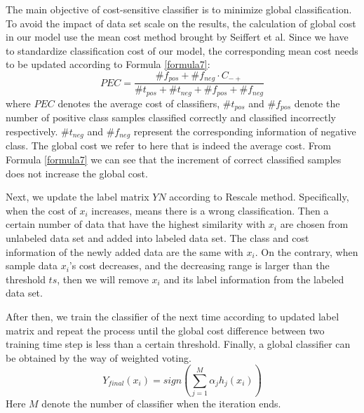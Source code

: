 \documentclass{svjour3}                     %
\begin{document}
The main objective of cost-sensitive classifier is to minimize global classification. To avoid the
impact of data set scale on the results, the calculation of global cost in our model use the mean cost method brought by Seiffert et al\cite{seiffert2008comparative}. Since we have to standardize classification cost of our model, the corresponding mean cost needs to be updated according to Formula \ref{formula7}:
\begin{equation} \label{formula7}
  PEC=\frac{{\# {f_{pos}} + \# {f_{neg}} \cdot {C_{ -  + }}}}{{\# {t_{pos}} + \# {t_{neg}} + \# {f_{pos}} + \# {f_{neg}}}}
\end{equation}
where $PEC$ denotes the average cost of classifiers, ${\# {t_{pos}}}$ and ${\# {f_{pos}}}$  denote the number of positive class samples classified correctly and classified incorrectly respectively. ${\# {t_{neg}}}$ and ${\# {f_{neg}}}$ represent the corresponding information of negative class. The global cost we refer to here that is indeed the average cost. From Formula \ref{formula7} we can see that the increment of correct classified samples does not increase the global cost. 

Next, we update the label matrix $YN$ according to Rescale method. Specifically, when the cost of $x_i$ increases, means there is a wrong classification. Then a certain number of data that have the highest similarity with $x_i$ are chosen from unlabeled data set and added into labeled data set. The class and cost information of the newly added data are the same with $x_i$. On the contrary, when sample data $x_i$'s cost decreases, and the decreasing range is larger than the threshold $ts$, then we will remove $x_i$ and its label information from the labeled data set.

After then, we train the classifier of the next time according to updated label matrix and repeat the process until the global cost difference between two training time step is less than a certain
threshold. Finally, a global classifier can be obtained by the way of weighted voting.
\begin{equation}
  {Y_{final}}\left( {{x_i}} \right) = sign\left( {\mathop \sum \limits_{j = 1}^M {\alpha _j}{h_j}\left( {{x_i}} \right)} \right)
\end{equation}
Here $M$ denote the number of classifier when the iteration ends. 
\end{document}
